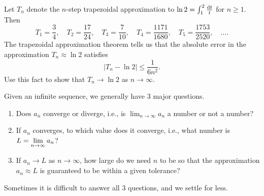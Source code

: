 \begin{example}
Let $T_n$ denote the $n$-step trapezoidal approximation to $\ln 2 = \int_1^2\frac{\mathrm{d} t}{t}$ for $n\ge 1$.
Then
\begin{equation*}
T_1 = \frac{3}{4},\quad
T_2 = \frac{17}{24},\quad
T_3 =\frac{7}{10},\quad
T_4=\frac{1171}{1680},\quad
T_5 = \frac{1753}{2520},\quad \dots.
\end{equation*}
The trapezoidal approximation theorem tells us that the absolute error in the approximation $T_n\approx \ln 2$ satisfies
\begin{equation*}
\left| T_n - \ln 2\right| \le \frac{1}{6n^2}.
\end{equation*}
Use this fact to show that $T_n\to \ln 2$ as $n\to\infty$.
\end{example}
\ifdefined\SOLUTION
{}
\fi

\vfill

\begin{remark}
Given an infinite sequence, we generally have 3 major questions.
\begin{enumerate}
\item Does $a_n$ converge or diverge, i.e., is $\lim_{n\to\infty} a_n$ a number or not a number?
\item If $a_n$ converges, to which value does it converge, i.e., what number is $\displaystyle L=\lim_{n\to\infty} a_n$?
\item If $a_n\to L$ as $n\to\infty$, how large do we need $n$ to be so that the approximation $a_n\approx L$ is guaranteed to be within a given tolerance?
\end{enumerate}
Sometimes it is difficult to answer all 3 questions, and we settle for less.
\end{remark}

